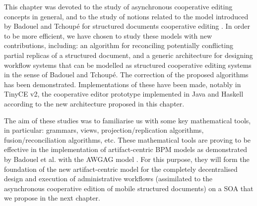 \label{chap2:sec:conclusion}
This chapter was devoted to the study of asynchronous cooperative editing concepts in general, and to the study of notions related to the model introduced by Badouel and Tchoup\'e for structured documents cooperative editing \cite{badouelTchoupeCmcs}. In order to be more efficient, we have chosen to study these models with new contributions, including: an algorithm for reconciling potentially conflicting partial replicas of a structured document, and a generic architecture for designing workflow systems that can be modelled as structured cooperative editing systems in the sense of Badouel and Tchoup\'e. The correction of the proposed algorithms has been demonstrated. Implementations of these have been made, notably in TinyCE v2, the cooperative editor prototype implemented in Java and Haskell according to the new architecture proposed in this chapter.

The aim of these studies was to familiarise us with some key mathematical tools, in particular: grammars, views, projection/replication algorithms, fusion/reconciliation algorithms, etc. These mathematical tools are proving to be effective in the implementation of artifact-centric BPM models as demonstrated by Badouel et al. with the AWGAG model \cite{badouel14, badouel2015active}. For this purpose, they will form the foundation of the new artifact-centric model for the completely decentralised design and execution of administrative workflows (assimilated to the asynchronous cooperative edition of mobile structured documents) on a SOA that we propose in the next chapter.
